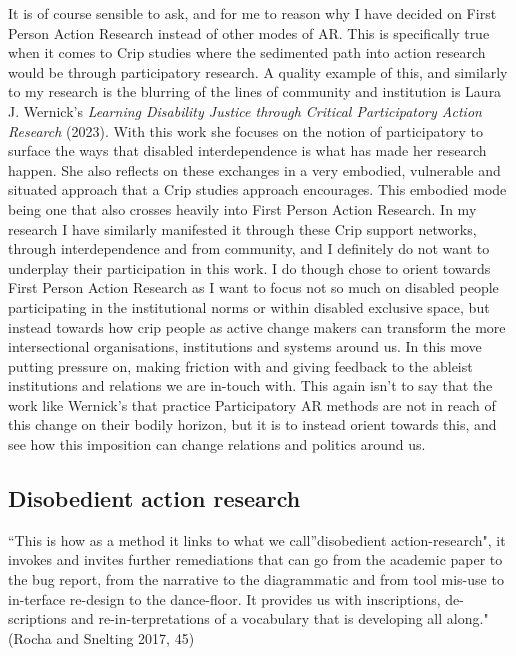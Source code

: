 It is of course sensible to ask, and for me to reason why I have decided
on First Person Action Research instead of other modes of AR. This is
specifically true when it comes to Crip studies where the sedimented
path into action research would be through participatory research. A
quality example of this, and similarly to my research is the blurring of
the lines of community and institution is Laura J. Wernick's
\emph{Learning Disability Justice through Critical Participatory Action
Research} (2023). With this work she focuses on the notion of
participatory to surface the ways that disabled interdependence is what
has made her research happen. She also reflects on these exchanges in a
very embodied, vulnerable and situated approach that a Crip studies
approach encourages. This embodied mode being one that also crosses
heavily into First Person Action Research. In my research I have
similarly manifested it through these Crip support networks, through
interdependence and from community, and I definitely do not want to
underplay their participation in this work. I do though chose to orient
towards First Person Action Research as I want to focus not so much on
disabled people participating in the institutional norms or within
disabled exclusive space, but instead towards how crip people as active
change makers can transform the more intersectional organisations,
institutions and systems around us. In this move putting pressure on,
making friction with and giving feedback to the ableist institutions and
relations we are in-touch with. This again isn't to say that the work
like Wernick's that practice Participatory AR methods are not in reach
of this change on their bodily horizon, but it is to instead orient
towards this, and see how this imposition can change relations and
politics around us.

\hypertarget{disobedient-action-research}{%
\subsection{Disobedient action
research}\label{disobedient-action-research}}

``This is how as a method it links to what we call''disobedient
action-research", it invokes and invites further remediations that can
go from the academic paper to the bug report, from the narrative to the
diagrammatic and from tool mis-use to in-terface re-design to the
dance-floor. It provides us with inscriptions, de-scriptions and
re-in-terpretations of a vocabulary that is developing all along."
(Rocha and Snelting 2017, 45)

